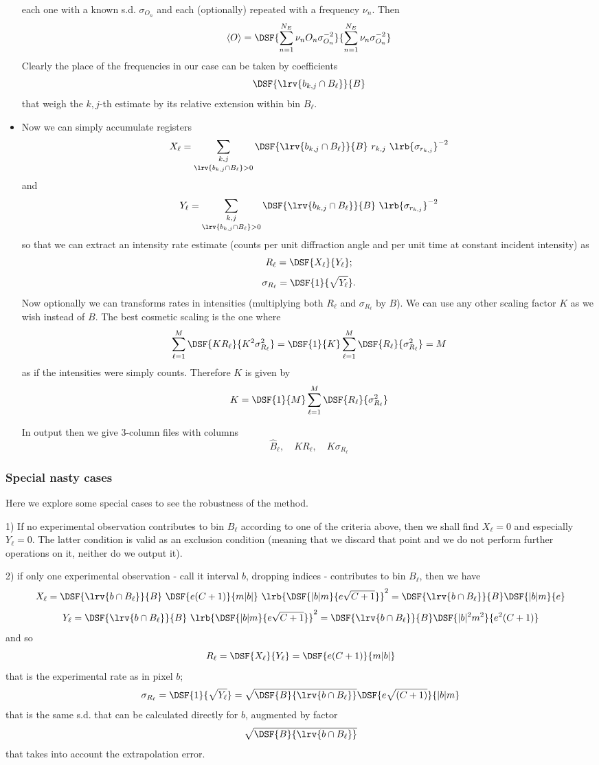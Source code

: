 \begin{itemize}
{each one with a known s.d. $\sigma_{O_n}$ and each (optionally) repeated with a frequency 
$\nu_n$. 
Then
\[
\langle O\rangle =\DSF{
\mathop{\sum}_{n=1}^{N_E}\nu_n
O_n\sigma_{O_n}^{-2}
}{
\mathop{\sum}_{n=1}^{N_E}\nu_n
\sigma_{O_n}^{-2}
}
\]
%
Clearly the place of the frequencies in our case can be taken by coefficients 
\[
\DSF{\lrv{ b_{k,j}\cap B_\ell }}{B}
\]
that weigh the $k,j$-th estimate by its relative extension within bin $B_\ell$.
}
\item[6.\ ]{
Now 
we can simply accumulate registers 
\[
X_\ell=\mathop{\sum_{k,j}}_{ \lrv{ b_{k,j}\cap B_\ell } > 0}
\DSF{\lrv{ b_{k,j}\cap B_\ell }}{B}\  r_{k,j}\ \lrb{\sigma_{r_{k,j}}}^{-2}
\]
and 
\[
Y_\ell=\mathop{\sum_{k,j}}_{ \lrv{ b_{k,j}\cap B_\ell } > 0}
\DSF{\lrv{ b_{k,j}\cap B_\ell }}{B}\  \lrb{\sigma_{r_{k,j}}}^{-2}
\]
so that we can extract an intensity rate estimate (counts per unit diffraction angle and per unit time at constant incident intensity) as
\[
R_\ell=\DSF{X_\ell}{Y_\ell};
\]
\[
\sigma_{R_\ell}=\DSF{1}{\sqrt{Y_\ell}}.
\]
Now optionally we can transforms rates in intensities (multiplying 
both $R_\ell$ and $\sigma_{R_\ell}$ by $B$).
We can use any other scaling factor $K$ as we wish instead of $B$.  
The best cosmetic scaling is the one where
\[
\mathop{\sum}_{\ell=1}^M\DSF{KR_\ell}{K^2\sigma_{R_\ell}^2}=
\DSF{1}{K}
\mathop{\sum}_{\ell=1}^M\DSF{R_\ell}{\sigma_{R_\ell}^2}=M
\]
as if the intensities were simply counts. 
Therefore $K$ is given by
\[
K=\DSF{
1
}{
M
}\mathop{\sum}_{\ell=1}^M\DSF{R_\ell}{\sigma_{R_\ell}^2}
\]

In output then we give 3-column files 
with columns
\[
\hat{B}_\ell, \quad KR_\ell, \quad K\sigma_{R_\ell}
\]
}
\end{itemize}

\subsubsection{Special nasty cases}

Here we explore some special cases to see the robustness 
of the method. 

1) If no experimental observation contributes to bin $B_\ell$ according to one of the criteria
above, then we shall find $X_\ell=0$ and especially $Y_\ell=0$. The latter condition is 
valid as an exclusion condition 
(meaning that we discard that point and we do not perform further operations on it, 
neither do we output it).

2) if only one experimental observation - call it interval $b$, dropping indices - contributes 
to bin $B_\ell$, 
then we have 
\[
X_\ell=\DSF{\lrv{ b\cap B_\ell }}{B}\  
\DSF{e(C+1)}{m|b|}\ 
\lrb{
\DSF{|b|m}{e\sqrt{C+1}}
}^{2}
=\DSF{\lrv{ b\cap B_\ell }}{B}\DSF{|b|m}{e}
\]
\[
Y_\ell=\DSF{\lrv{ b\cap B_\ell }}{B}\  
\lrb{
\DSF{|b|m}{e\sqrt{C+1}}
}^{2}
=\DSF{\lrv{ b\cap B_\ell }}{B}\DSF{|b|^2m^2}{e^2(C+1)}
\]
and so
\[
R_\ell=\DSF{X_\ell}{Y_\ell}=\DSF{e(C+1)}{m|b|}
\]
that is the experimental rate as in pixel $b$;
\[
\sigma_{R_\ell}=\DSF{1}{\sqrt{Y_\ell}}=
\sqrt{\DSF{B}{\lrv{ b\cap B_\ell }}}
%
\DSF{e\sqrt{(C+1)}}{|b|m}
\]
that is the same s.d. that can be calculated directly for $b$, augmented by factor 
\[
\sqrt{\DSF{B}{\lrv{ b\cap B_\ell }}}
\]
that takes into account the extrapolation error.

